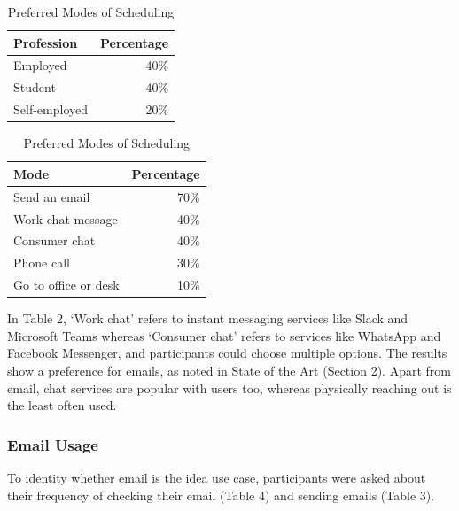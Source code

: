 \documentclass{article}
\begin{document}
\begin{table}[!htb]
    \begin{minipage}{.5\linewidth}
   	 \caption{Professions of Participants}
      \centering
        \begin{tabular}{lr}
	        \hline
            \textbf{Profession} & \textbf{Percentage} \\
            \hline
            Employed & 40\% \\
            Student & 40\% \\
            Self-employed & 20\% \\
            \hline
        \end{tabular}
    \end{minipage}%
    \hspace{.1cm}
    \begin{minipage}{.5\linewidth}
      \centering
	    \caption{Preferred Modes of Scheduling}
        \begin{tabular}{lr}
	        \hline
            \textbf{Mode} & \textbf{Percentage} \\
            \hline
            Send an email & 70\% \\
            Work chat message & 40\% \\
            Consumer chat & 40\% \\
            Phone call & 30\% \\
            Go to office or desk & 10\% \\
            \hline
        \end{tabular}
    \end{minipage} 
\end{table}

In Table 2, `Work chat' refers to instant messaging services like Slack and Microsoft Teams whereas `Consumer chat' refers to services like WhatsApp and Facebook Messenger, and participants could choose multiple options. The results show a preference for emails, as noted in State of the Art (Section 2). Apart from email, chat services are popular with users too, whereas physically reaching out is the least often used.

\subsubsection{Email Usage}

To identity whether email is the idea use case, participants were asked about their frequency of checking their email (Table 4) and sending emails (Table 3).
\end{document}
